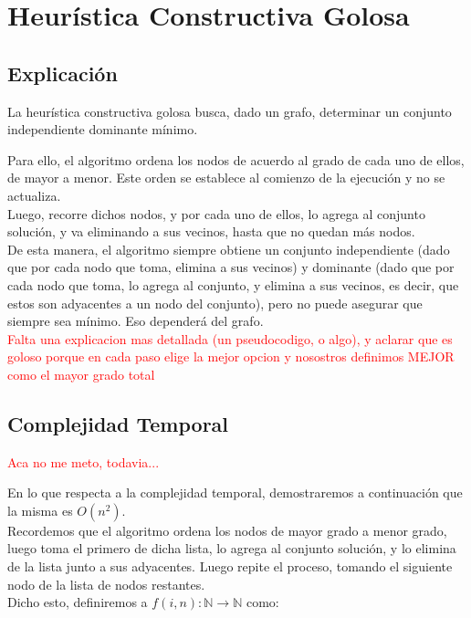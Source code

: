 \section{Heur\'istica Constructiva Golosa} \label{ej3}
\subsection{Explicaci\'on}
La heurística constructiva golosa busca, dado un grafo, determinar un conjunto independiente dominante mínimo. 

Para ello, el algoritmo ordena los nodos de acuerdo al grado de cada uno de ellos, de mayor a menor. Este orden se establece al comienzo de la ejecución y no se actualiza.\\

Luego, recorre dichos nodos, y por cada uno de ellos, lo agrega al conjunto solución, y va eliminando a sus vecinos, hasta que no quedan más nodos.\\

De esta manera, el algoritmo siempre obtiene un conjunto independiente (dado que por cada nodo que toma, elimina a sus vecinos) y dominante (dado que por cada nodo que toma, lo agrega al conjunto, y elimina a sus vecinos, es decir, que estos son adyacentes a un nodo del conjunto), pero no puede asegurar que siempre sea mínimo. Eso dependerá del grafo.\\

\textcolor{red}{Falta una explicacion mas detallada (un pseudocodigo, o algo), y aclarar que es goloso porque en cada paso elige la mejor opcion y nosostros definimos MEJOR como el mayor grado total}

\newpage
\subsection{Complejidad Temporal}
\textcolor{red}{Aca no me meto, todavia...}

En lo que respecta a la complejidad temporal, demostraremos a continuación que la misma es $O(n^{2})$.\\

Recordemos que el algoritmo ordena los nodos de mayor grado a menor grado, luego toma el primero de dicha lista, lo agrega al conjunto solución, y lo elimina de la lista junto a sus adyacentes. Luego repite el proceso, tomando el siguiente nodo de la lista de nodos restantes.\\
Dicho esto, definiremos a $f(i,n): \mathbb{N} \rightarrow \mathbb{N}$ como:

